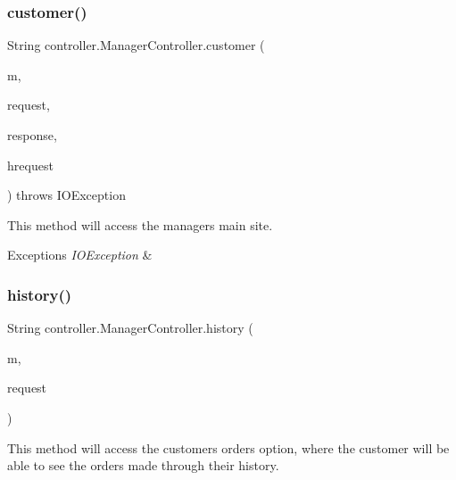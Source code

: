\subsubsection{\texorpdfstring{customer()}{customer()}}
{\footnotesize\ttfamily String controller.\+Manager\+Controller.\+customer (\begin{DoxyParamCaption}\item[{Model}]{m,  }\item[{Web\+Request}]{request,  }\item[{Http\+Servlet\+Response}]{response,  }\item[{Http\+Servlet\+Request}]{hrequest }\end{DoxyParamCaption}) throws I\+O\+Exception\hspace{0.3cm}{\ttfamily [inline]}}

This method will access the manager\textquotesingle{}s main site. 
\begin{DoxyExceptions}{Exceptions}
{\em I\+O\+Exception} & \\
\hline
\end{DoxyExceptions}
\mbox{\label{classcontroller_1_1_manager_controller_a06fcd2a1ad144e711de97430841a804f}} 
\subsubsection{\texorpdfstring{history()}{history()}}
{\footnotesize\ttfamily String controller.\+Manager\+Controller.\+history (\begin{DoxyParamCaption}\item[{Model}]{m,  }\item[{Web\+Request}]{request }\end{DoxyParamCaption})\hspace{0.3cm}{\ttfamily [inline]}}

This method will access the customer\textquotesingle{}s \textquotesingle{}orders\textquotesingle{} option, where the customer will be able to see the orders made through their history. \mbox{\label{classcontroller_1_1_manager_controller_a32dde55b16d1fb8e38f0a4f1cc0351be}} 
